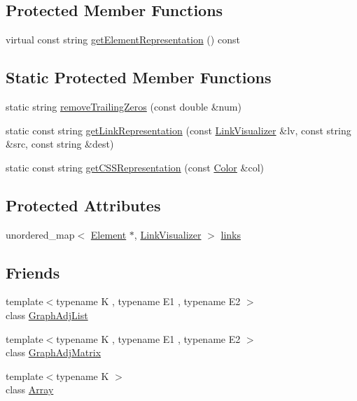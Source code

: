 \subsection*{Protected Member Functions}
\begin{DoxyCompactItemize}
\item 
virtual const string \mbox{\hyperlink{classbridges_1_1_element_abfea1b7226b774be648e15f6b2c9daba}{get\+Element\+Representation}} () const
\end{DoxyCompactItemize}
\subsection*{Static Protected Member Functions}
\begin{DoxyCompactItemize}
\item 
static string \mbox{\hyperlink{classbridges_1_1_element_a0b905a076a71771a20ee4fb0ec858cfa}{remove\+Trailing\+Zeros}} (const double \&num)
\item 
static const string \mbox{\hyperlink{classbridges_1_1_element_ac6fa7b04e28a1e9b8d8f2d395dd6e2c1}{get\+Link\+Representation}} (const \mbox{\hyperlink{classbridges_1_1_link_visualizer}{Link\+Visualizer}} \&lv, const string \&src, const string \&dest)
\item 
static const string \mbox{\hyperlink{classbridges_1_1_element_a513b3409e4b689a390b0dcd50cc2d643}{get\+C\+S\+S\+Representation}} (const \mbox{\hyperlink{classbridges_1_1_color}{Color}} \&col)
\end{DoxyCompactItemize}
\subsection*{Protected Attributes}
\begin{DoxyCompactItemize}
\item 
unordered\+\_\+map$<$ \mbox{\hyperlink{classbridges_1_1_element}{Element}} $\ast$, \mbox{\hyperlink{classbridges_1_1_link_visualizer}{Link\+Visualizer}} $>$ \mbox{\hyperlink{classbridges_1_1_element_a6fb53728edc378f26238543b26238496}{links}}
\end{DoxyCompactItemize}
\subsection*{Friends}
\begin{DoxyCompactItemize}
\item 
{\footnotesize template$<$typename K , typename E1 , typename E2 $>$ }\\class \mbox{\hyperlink{classbridges_1_1_element_a65850138f0763fec43a76fb942f0eccc}{Graph\+Adj\+List}}
\item 
{\footnotesize template$<$typename K , typename E1 , typename E2 $>$ }\\class \mbox{\hyperlink{classbridges_1_1_element_a1935808473b7eb8ff54149c5436c3ac9}{Graph\+Adj\+Matrix}}
\item 
{\footnotesize template$<$typename K $>$ }\\class \mbox{\hyperlink{classbridges_1_1_element_ab1a595168ea1870ce436dfd2d8e69b6d}{Array}}
\end{DoxyCompactItemize}


